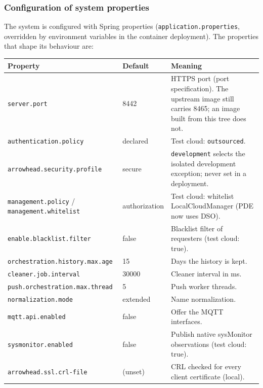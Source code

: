 \documentclass[a4paper]{arrowhead}
\begin{document}
\subsubsection{Configuration of system properties}

The system is configured with Spring properties (\texttt{application.properties}, overridden by environment variables in the container deployment). The properties that shape its behaviour are:

\noindent\begin{longtable}{| p{5.4cm} | p{3.4cm} | p{6.4cm} |} \hline
\rowcolor{gray!33} Property & Default & Meaning \\ \hline \endhead
\texttt{server.\allowbreak{}port} & 8442 & HTTPS port (port specification). The upstream image still carries 8465; an image built from this tree does not. \\ \hline
\texttt{authentication.\allowbreak{}policy} & declared & Test cloud: \texttt{outsourced}. \\ \hline
\texttt{arrowhead.\allowbreak{}security.\allowbreak{}profile} & secure & \texttt{development} selects the isolated development exception; never set in a deployment. \\ \hline
\texttt{management.\allowbreak{}policy} / \texttt{management.\allowbreak{}whitelist} & authorization & Test cloud: whitelist LocalCloudManager (PDE now uses DSO). \\ \hline
\texttt{enable.\allowbreak{}blacklist.\allowbreak{}filter} & false & Blacklist filter of requesters (test cloud: true). \\ \hline
\texttt{orchestration.\allowbreak{}history.\allowbreak{}max.\allowbreak{}age} & 15 & Days the history is kept. \\ \hline
\texttt{cleaner.\allowbreak{}job.\allowbreak{}interval} & 30000 & Cleaner interval in ms. \\ \hline
\texttt{push.\allowbreak{}orchestration.\allowbreak{}max.\allowbreak{}thread} & 5 & Push worker threads. \\ \hline
\texttt{normalization.\allowbreak{}mode} & extended & Name normalization. \\ \hline
\texttt{mqtt.\allowbreak{}api.\allowbreak{}enabled} & false & Offer the MQTT interfaces. \\ \hline
\texttt{sysmonitor.\allowbreak{}enabled} & false & Publish native sysMonitor observations (test cloud: true). \\ \hline
\texttt{arrowhead.\allowbreak{}ssl.\allowbreak{}crl-\allowbreak{}file} & (unset) & CRL checked for every client certificate (local). \\ \hline
\end{longtable}
\end{document}
